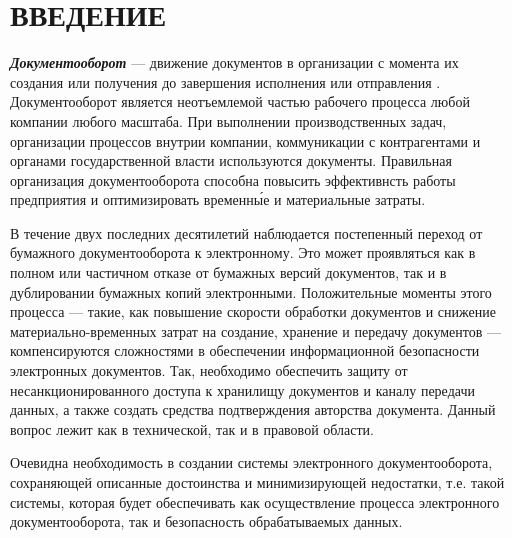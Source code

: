 \chapter*{ВВЕДЕНИЕ}							%

\textbf{\textit{Документооборот}} --- движение документов в организации с момента их создания или получения до завершения исполнения или отправления \cite{gost51141}.
Документооборот является неотъемлемой частью рабочего процесса любой компании любого масштаба. При выполнении производственных задач, организации процессов внутрии компании, коммуникации с контрагентами и органами государственной власти используются документы. Правильная организация документооборота способна повысить эффективнсть работы предприятия и оптимизировать временн\'{ы}е и материальные затраты.

\vspace{\baselineskip}
В течение двух последних десятилетий наблюдается постепенный переход от бумажного документооборота к электронному. Это может проявляться как в полном или частичном отказе от бумажных версий документов, так и в дублировании бумажных копий электронными. Положительные моменты этого процесса --- такие, как повышение скорости обработки документов и снижение материально-временных затрат на создание, хранение и передачу документов --- компенсируются сложностями в обеспечении информационной безопасности электронных документов. Так, необходимо обеспечить защиту от несанкционированного доступа к хранилищу документов и каналу передачи данных, а также создать средства подтверждения авторства документа. Данный вопрос лежит как в технической, так и в правовой области.

\vspace{\baselineskip}
Очевидна необходимость в создании системы электронного документооборота, сохраняющей описанные достоинства и минимизирующей недостатки, т.е. такой системы, которая будет обеспечивать как осуществление процесса электронного документооборота, так и безопасность обрабатываемых данных.

